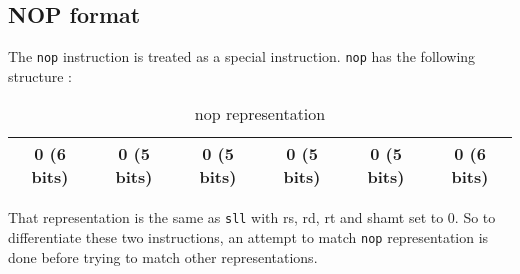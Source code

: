 \subsection*{NOP format}

	The \verb?nop? instruction is treated as a special instruction. \verb?nop? has the following structure : 
	\begin{table}[H]
	\centering
	\begin{tabular}{|c|c|c|c|c|c|}
	\hline 
	0 (6 bits) & 0 (5 bits) & 0 (5 bits) & 0 (5 bits) & 0 (5 bits) & 0 (6 bits) \\ 
	\hline 
	\end{tabular} 
	\caption{nop representation}
	\end{table}
	
	That representation is the same as \verb?sll? with rs, rd, rt and shamt set to 0. So to differentiate these two instructions, an attempt to match \verb?nop? representation is done before trying to match other representations.